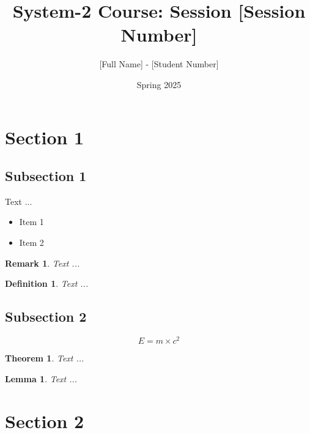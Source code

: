 \documentclass[10pt, oneside]{article}
\title{System-2 Course: Session [Session Number]}
\author{[Full Name] - [Student Number]}
\date{Spring 2025}
\newtheorem{thm}{Theorem}
\newtheorem{defn}{Definition}
\newtheorem{rem}{Remark}
\newtheorem{lem}{Lemma}
\begin{document}
\maketitle

\tableofcontents

\pagebreak

\section{Section 1}

\subsection{Subsection 1}

Text ...

\begin{itemize}
    \item Item 1
    \item Item 2
\end{itemize}

\begin{rem}
    Text ...
\end{rem}

\begin{defn}
    Text ...
\end{defn}

\subsection{Subsection 2}

\begin{equation}
    E = m \times c^2
\end{equation}

\begin{thm}
    Text ...  
\end{thm}

\begin{lem}
    Text ...  
\end{lem}

\section{Section 2}

\end{document}
